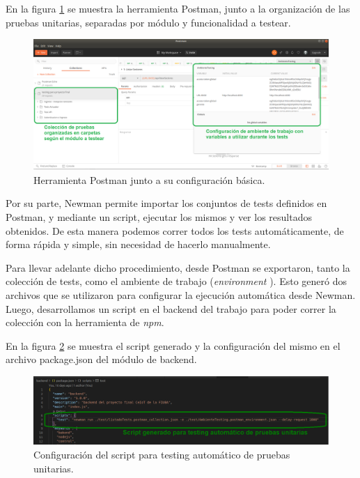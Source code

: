 En la figura \ref{fig:Postmanconfig} se muestra la herramienta Postman, junto a la organización de las pruebas unitarias, separadas por módulo y funcionalidad a testear.


\begin{figure}[ht]
	\centering
	\includegraphics[width=1\textwidth]{./Figures/postman.png}
	\caption{Herramienta Postman junto a su configuración básica.}
	\label{fig:Postmanconfig}
\end{figure}

Por su parte, Newman permite importar los conjuntos de tests definidos en Postman, y mediante un script, ejecutar los mismos y ver los resultados obtenidos. De esta manera podemos correr todos los tests automáticamente, de forma rápida y simple, sin necesidad de hacerlo manualmente.

Para llevar adelante dicho procedimiento, desde Postman se exportaron, tanto la colección de tests, como el ambiente de trabajo (\textit{environment} \citep{WEBSITE:EnvironmentPostman}). Esto generó dos archivos que se utilizaron para configurar la ejecución automática desde Newman. Luego, desarrollamos un script en el backend del trabajo para poder correr la colección con la herramienta de \textit{npm}.

En la figura \ref{fig:scriptNewman} se muestra el script generado y la configuración del mismo en el archivo package.json del módulo de backend.


\begin{figure}[ht]
	\centering
	\includegraphics[width=1\textwidth]{./Figures/scriptNewman.png}
	\caption{Configuración del script para testing automático de pruebas unitarias.}
	\label{fig:scriptNewman}
\end{figure}

